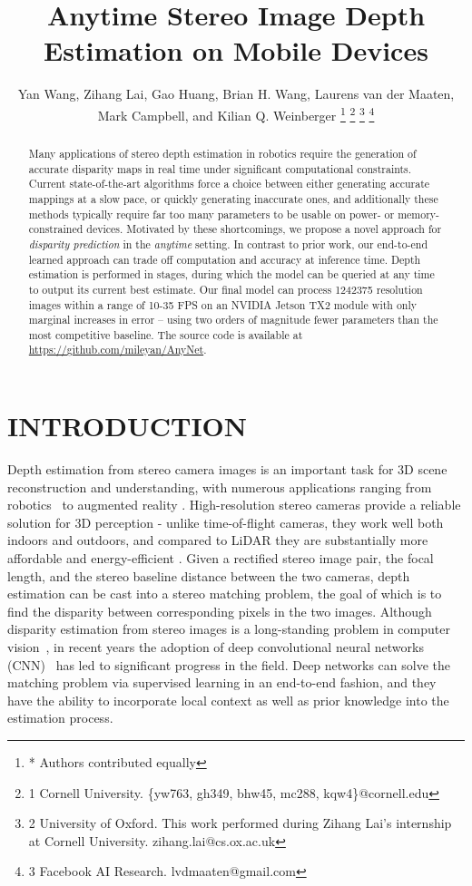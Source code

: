 \documentclass[letterpaper, 10 pt, conference]{ieeeconf}
\title{\LARGE \bf
	Anytime Stereo Image Depth Estimation on Mobile Devices
}
\author{Yan Wang, Zihang Lai, Gao Huang, Brian H. Wang, Laurens van der Maaten, \\ Mark Campbell, and Kilian Q. Weinberger
\thanks{* Authors contributed equally}
\thanks{1 Cornell University. \{yw763, gh349, bhw45, mc288, kqw4\}@cornell.\newline edu}
\thanks{2 University of Oxford. This work performed during Zihang Lai's internship at Cornell University.
	{\small zihang.lai@cs.ox.ac.uk}}
\thanks{3 Facebook AI Research.
	{\small lvdmaaten@gmail.com}}
 }
\begin{document}
	
	
	\maketitle
	\thispagestyle{empty}
	\pagestyle{empty}
	
	\begin{abstract}		
Many applications of stereo depth estimation in robotics require the generation of accurate disparity maps in real time under significant computational constraints. Current state-of-the-art algorithms force a choice between either generating accurate mappings at a slow pace, or quickly generating inaccurate ones, and additionally these methods typically require far too many parameters to be usable on power- or memory-constrained devices. 
  Motivated by these shortcomings, we propose a novel approach for \emph{disparity prediction} in the \emph{anytime} setting. In contrast to prior work, our end-to-end learned approach can trade off computation and accuracy at inference time. Depth estimation is performed in stages, during which the model can be queried at any time to output its current best estimate.  
Our final model can process 1242375 resolution images within a range of 10-35 FPS on an NVIDIA Jetson TX2 module with only marginal increases in error -- using two orders of magnitude fewer parameters than the most competitive baseline. 
 The source code is available at \url{https://github.com/mileyan/AnyNet}.
\end{abstract}
	
	
	

\section{INTRODUCTION}

Depth estimation from stereo camera images is an important task for 3D scene reconstruction and understanding, with numerous applications ranging from robotics~\cite{mancini2016fast,ye2017self,saxena2007depth,schmid2013stereo} to augmented reality \cite{zenati2007dense,alhaija2018augmented,nguyen2018depth}. High-resolution stereo cameras provide a reliable solution for 3D perception - unlike time-of-flight cameras, they work well both indoors and outdoors, and compared to LiDAR they are substantially more affordable and energy-efficient \cite{luo2016efficient}. Given a rectified stereo image pair, the focal length, and the stereo baseline distance between the two cameras, depth estimation can be cast into a stereo matching problem, the goal of which is to find the disparity between corresponding pixels in the two images. Although disparity estimation from stereo images is a long-standing problem in computer vision~\cite{lucas1981iterative}, in recent years the adoption of deep convolutional neural networks (CNN)~\cite{zbontar2016stereo,mayer2016large,kendall2017end,liang2017learning,pang2017cascade} has led to significant progress in the field. Deep networks can solve the matching problem via supervised learning in an end-to-end fashion, and they have the ability to incorporate local context as well as prior knowledge into the estimation process. 
\end{document}
